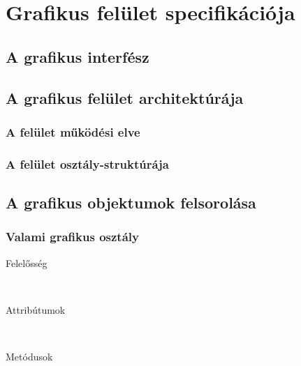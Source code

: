 


\setcounter{section}{10}




\fedlap

\section{Grafikus felület specifikációja}

\subsection{A grafikus interfész}

\subsection{A grafikus felület architektúrája}

\subsubsection{A felület működési elve}

\subsubsection{A felület osztály-struktúrája}

\subsection{A grafikus objektumok felsorolása}

\subsubsection{Valami grafikus osztály}
	\begin{description}
		\item[Felelősség] \hfill \\
		
		
		\item[Attribútumok]\hfill \\
		
				
		\item[Metódusok]\hfill \\
		
						
	\end{description}


